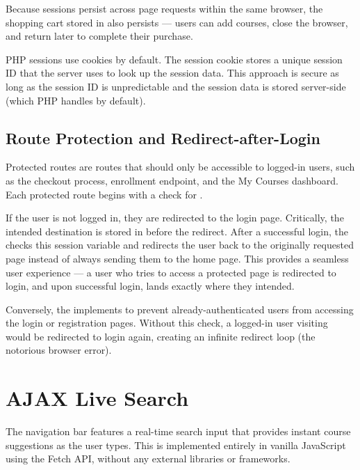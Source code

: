 \documentclass[12pt,a4paper]{report}
\begin{document}
Because sessions persist across page requests within the same browser, the shopping cart stored in  also persists — users can add courses, close the browser, and return later to complete their purchase.

PHP sessions use cookies by default. The session cookie stores a unique session ID that the server uses to look up the session data. This approach is secure as long as the session ID is unpredictable and the session data is stored server-side (which PHP handles by default).

\subsection{Route Protection and Redirect-after-Login}

Protected routes are routes that should only be accessible to logged-in users, such as the checkout process, enrollment endpoint, and the My Courses dashboard. Each protected route begins with a check for .

If the user is not logged in, they are redirected to the login page. Critically, the intended destination is stored in  before the redirect. After a successful login, the  checks this session variable and redirects the user back to the originally requested page instead of always sending them to the home page. This provides a seamless user experience — a user who tries to access a protected page is redirected to login, and upon successful login, lands exactly where they intended.

Conversely, the  implements  to prevent already-authenticated users from accessing the login or registration pages. Without this check, a logged-in user visiting  would be redirected to login again, creating an infinite redirect loop (the notorious  browser error).

\section{AJAX Live Search}

The navigation bar features a real-time search input that provides instant course suggestions as the user types. This is implemented entirely in vanilla JavaScript using the Fetch API, without any external libraries or frameworks.
\end{document}
